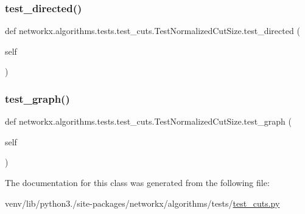 \subsubsection{\texorpdfstring{test\+\_\+directed()}{test\_directed()}}
{\footnotesize\ttfamily def networkx.\+algorithms.\+tests.\+test\+\_\+cuts.\+Test\+Normalized\+Cut\+Size.\+test\+\_\+directed (\begin{DoxyParamCaption}\item[{}]{self }\end{DoxyParamCaption})}

\mbox{\label{classnetworkx_1_1algorithms_1_1tests_1_1test__cuts_1_1TestNormalizedCutSize_a786f236bc8a2fefcdfa4f225d71cd8c8}} 
\subsubsection{\texorpdfstring{test\+\_\+graph()}{test\_graph()}}
{\footnotesize\ttfamily def networkx.\+algorithms.\+tests.\+test\+\_\+cuts.\+Test\+Normalized\+Cut\+Size.\+test\+\_\+graph (\begin{DoxyParamCaption}\item[{}]{self }\end{DoxyParamCaption})}



The documentation for this class was generated from the following file\+:\begin{DoxyCompactItemize}
\item 
venv/lib/python3./site-\/packages/networkx/algorithms/tests/\hyperlink{tests_2test__cuts_8py}{test\+\_\+cuts.\+py}\end{DoxyCompactItemize}
